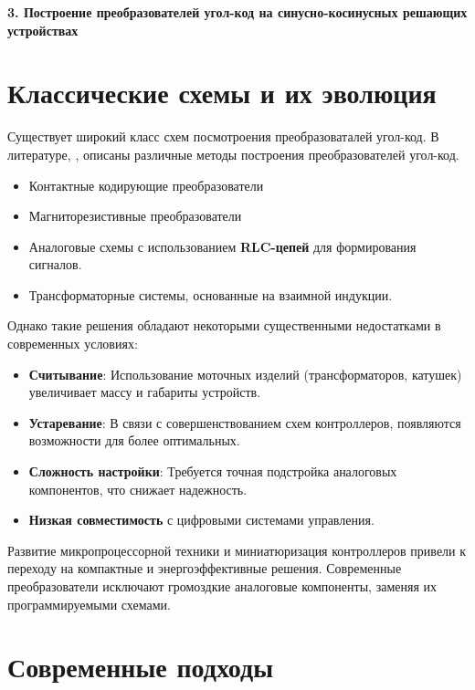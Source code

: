 \newpage
\begin{center}
  \textbf{\large 3. Построение преобразователей угол-код на синусно-косинусных решающих устройствах}
\end{center}


\section{Классические схемы и их эволюция}

Существует широкий класс схем посмотроения преобразоваталей угол-код.
В литературе, \cite{Vulvet}, описаны различные методы построения преобразователей угол-код. 

\begin{itemize}
  \item Контактные кодирующие преобразователи 
  \item Магниторезистивные преобразователи
  \item Аналоговые схемы с использованием \textbf{RLC-цепей} для формирования сигналов.
  \item Трансформаторные системы, основанные на взаимной индукции.
\end{itemize}

Однако такие решения обладают некоторыми существенными недостатками в современных условиях:
\begin{itemize}
  \item \textbf{Считывание}: Использование моточных изделий (трансформаторов, катушек) увеличивает массу и габариты устройств.
  \item \textbf{Устаревание}: В связи с совершенствованием схем контроллеров, появляются возможности для более оптимальных.
  \item \textbf{Сложность настройки}: Требуется точная подстройка аналоговых компонентов, что снижает надежность.
  \item \textbf{Низкая совместимость} с цифровыми системами управления.
\end{itemize}

Развитие микропроцессорной техники и миниатюризация контроллеров привели к переходу на компактные и энергоэффективные решения. 
Современные преобразователи исключают громоздкие аналоговые компоненты, заменяя их программируемыми схемами.

\section{Современные подходы}

